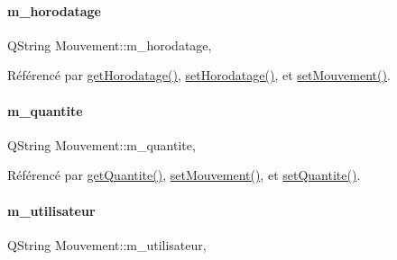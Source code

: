 \mbox{\label{class_mouvement_a24f34a74c17068f6c98635400862adcd}} 
\paragraph{\texorpdfstring{m\+\_\+horodatage}{m\_horodatage}}
{\footnotesize\ttfamily Q\+String Mouvement\+::m\+\_\+horodatage\hspace{0.3cm}{\ttfamily [read]}, {\ttfamily [write]}}



Référencé par \hyperlink{class_mouvement_ab6990fd5ea6c47ab3fb6a8a4944c2df9}{get\+Horodatage()}, \hyperlink{class_mouvement_ab0bd90180d06f2ed37fb2b796f31aeb8}{set\+Horodatage()}, et \hyperlink{class_mouvement_a5c7f0e876b2292627e9d1bef12de03a3}{set\+Mouvement()}.

\mbox{\label{class_mouvement_ab6040d52ca99ef88d253b1742e70ffd3}} 
\paragraph{\texorpdfstring{m\+\_\+quantite}{m\_quantite}}
{\footnotesize\ttfamily Q\+String Mouvement\+::m\+\_\+quantite\hspace{0.3cm}{\ttfamily [read]}, {\ttfamily [write]}}



Référencé par \hyperlink{class_mouvement_a427e1320936bfaf09ca0b2c42ae9dd98}{get\+Quantite()}, \hyperlink{class_mouvement_a5c7f0e876b2292627e9d1bef12de03a3}{set\+Mouvement()}, et \hyperlink{class_mouvement_aa9ed36b12cb4c46f851682d630cc28f8}{set\+Quantite()}.

\mbox{\label{class_mouvement_adee253bf00365d1cb4c45bd58d8b3e58}} 
\paragraph{\texorpdfstring{m\+\_\+utilisateur}{m\_utilisateur}}
{\footnotesize\ttfamily Q\+String Mouvement\+::m\+\_\+utilisateur\hspace{0.3cm}{\ttfamily [read]}, {\ttfamily [write]}}



